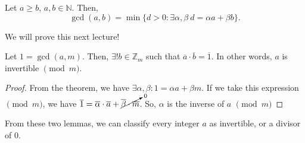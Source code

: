 \begin{theorem}
	Let \( a\ge b \), \( a,b \in \mathbb{N} \). Then, \[
		\gcd(a,b) = \min \{d > 0 : \exists \alpha ,\beta ~ d = \alpha a + \beta b\}  
	.\] 
\end{theorem}

We will prove this next lecture!

\begin{lemma}
	Let \( 1=\gcd(a,m) \). Then, \( \exists ! b \in \mathbb{Z}_m \) such that \( \overline{a}  \cdot \overline{b} = \overline{1} \). In other words, \( a \) is invertible \( \pmod m \).
\end{lemma}

\begin{proof}
	From the theorem, we have \( \exists \alpha ,\beta : 1 = \alpha a + \beta m \). If we take this expression \( \pmod m \), we have \( \overline{1}=\overline{\alpha }\cdot \overline{a}+\cancelto{0}{\overline{\beta }\cdot \overline{m}}      \). So, \( \alpha  \) is the inverse of \( a \) \( \pmod m \)
\end{proof}

\begin{note}
	From these two lemmas, we can classify every integer \( a \) as invertible, or a divisor of 0.
\end{note}


